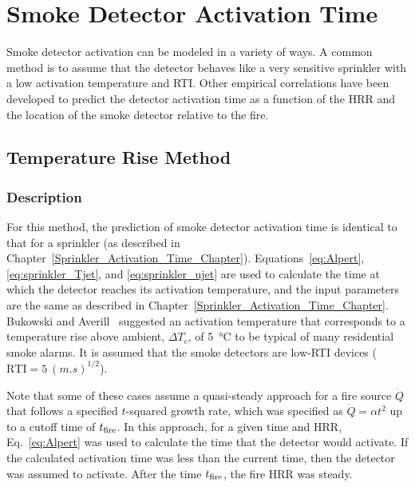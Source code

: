 
\chapter{Smoke Detector Activation Time}
\label{Smoke_Detector_Activation_Time_Chapter}

Smoke detector activation can be modeled in a variety of ways. A common method is to assume that the detector behaves like a very sensitive sprinkler with a low activation temperature and RTI. Other empirical correlations have been developed to predict the detector activation time as a function of the HRR and the location of the smoke detector relative to the fire.

\section{Temperature Rise Method}
\label{sec:Temperature_Rise}

\subsection*{Description}

For this method, the prediction of smoke detector activation time is identical to that for a sprinkler (as described in Chapter~\ref{Sprinkler_Activation_Time_Chapter}). Equations~\ref{eq:Alpert}, \ref{eq:sprinkler_Tjet}, and \ref{eq:sprinkler_ujet} are used to calculate the time at which the detector reaches its activation temperature, and the input parameters are the same as described in Chapter~\ref{Sprinkler_Activation_Time_Chapter}. Bukowski and Averill~\cite{Bukowski:2} suggested an activation temperature that corresponds to a temperature rise above ambient, $\Delta T_c$, of \SI{5}{\celsius} to be typical of many residential smoke alarms. It is assumed that the smoke detectors are low-RTI devices ($\textrm{RTI}=5~\si{(m.s)^{1/2}}$).

Note that some of these cases assume a quasi-steady approach for a fire source $\dot Q$ that follows a specified $t$-squared growth rate, which was specified as $\dot Q = \alpha t^2$ up to a cutoff time of $t\sb{fire}$. In this approach, for a given time and HRR, Eq.~\ref{eq:Alpert} was used to calculate the time that the detector would activate. If the calculated activation time was less than the current time, then the detector was assumed to activate. After the time $t\sb{fire}$, the fire HRR was steady.


